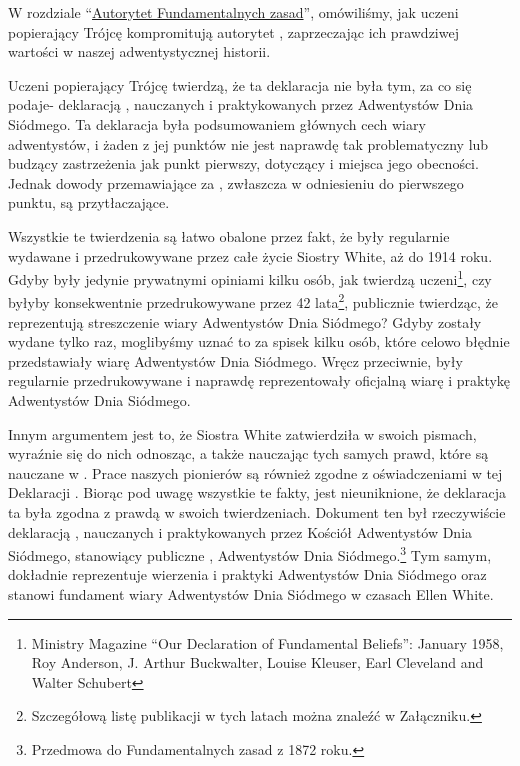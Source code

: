 W rozdziale “\hyperref[chap:authority]{Autorytet Fundamentalnych zasad}”, omówiliśmy, jak uczeni popierający Trójcę kompromitują autorytet , zaprzeczając ich prawdziwej wartości w naszej adwentystycznej historii.

Uczeni popierający Trójcę twierdzą, że ta deklaracja nie była tym, za co się podaje- deklaracją , nauczanych i praktykowanych przez Adwentystów Dnia Siódmego. Ta deklaracja była podsumowaniem głównych cech wiary adwentystów, i żaden z jej punktów nie jest naprawdę tak problematyczny lub budzący zastrzeżenia jak  punkt pierwszy, dotyczący  i miejsca jego obecności. Jednak dowody przemawiające za  , zwłaszcza w odniesieniu do pierwszego punktu, są przytłaczające.

Wszystkie te twierdzenia są łatwo obalone przez fakt, że  były regularnie wydawane i przedrukowywane przez całe życie Siostry White, aż do 1914 roku. Gdyby były jedynie prywatnymi opiniami kilku osób, jak twierdzą uczeni\footnote{Ministry Magazine “Our Declaration of Fundamental Beliefs”: January 1958, Roy Anderson, J. Arthur Buckwalter, Louise Kleuser, Earl Cleveland and Walter Schubert}, czy byłyby konsekwentnie przedrukowywane przez 42 lata\footnote{Szczegółową listę publikacji w tych latach można znaleźć w Załączniku.}, publicznie twierdząc, że reprezentują streszczenie wiary Adwentystów Dnia Siódmego? Gdyby zostały wydane tylko raz, moglibyśmy uznać to za spisek kilku osób, które celowo błędnie przedstawiały wiarę Adwentystów Dnia Siódmego. Wręcz przeciwnie,  były regularnie przedrukowywane i naprawdę reprezentowały oficjalną wiarę i praktykę Adwentystów Dnia Siódmego.

Innym argumentem jest to, że Siostra White zatwierdziła  w swoich pismach, wyraźnie się do nich odnosząc, a także nauczając tych samych prawd, które są nauczane w . Prace naszych pionierów są również zgodne z oświadczeniami w tej Deklaracji . Biorąc pod uwagę wszystkie te fakty, jest nieuniknione, że deklaracja ta była zgodna z prawdą w swoich twierdzeniach. Dokument ten był rzeczywiście deklaracją , nauczanych i praktykowanych przez Kościół Adwentystów Dnia Siódmego, stanowiący publiczne ,  Adwentystów Dnia Siódmego.\footnote{Przedmowa do Fundamentalnych zasad z 1872 roku.} Tym samym, dokładnie reprezentuje wierzenia i praktyki Adwentystów Dnia Siódmego oraz stanowi fundament wiary Adwentystów Dnia Siódmego w czasach Ellen White.

